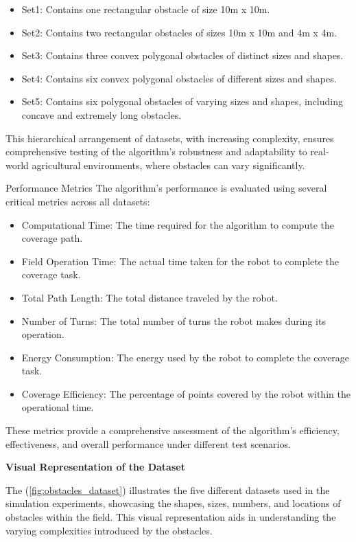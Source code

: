 \begin{itemize}
    \item Set1: Contains one rectangular obstacle of size 10m x 10m.
    \item Set2: Contains two rectangular obstacles of sizes 10m x 10m and 4m x 4m.
    \item Set3: Contains three convex polygonal obstacles of distinct sizes and shapes.
    \item Set4: Contains six convex polygonal obstacles of different sizes and shapes.
    \item Set5: Contains six polygonal obstacles of varying sizes and shapes, including concave and extremely long obstacles.
\end{itemize}
This hierarchical arrangement of datasets, with increasing complexity, ensures comprehensive testing of the algorithm's robustness and adaptability to real-world agricultural environments, where obstacles can vary significantly.

\vspace{3mm}  

Performance Metrics
The algorithm's performance is evaluated using several critical metrics across all datasets:

\begin{itemize}
    \item Computational Time: The time required for the algorithm to compute the coverage path.
    \item Field Operation Time: The actual time taken for the robot to complete the coverage task.
    \item Total Path Length: The total distance traveled by the robot.
    \item Number of Turns: The total number of turns the robot makes during its operation.
    \item Energy Consumption: The energy used by the robot to complete the coverage task.
    \item Coverage Efficiency: The percentage of points covered by the robot within the operational time.
\end{itemize}
These metrics provide a comprehensive assessment of the algorithm's efficiency, effectiveness, and overall performance under different test scenarios.


\vspace{3mm}  

\textbf{Visual Representation of the Dataset}

The (\autoref{fig:obstacles_dataset}) illustrates the five different datasets used in the simulation experiments, showcasing the shapes, sizes, numbers, and locations of obstacles within the field. This visual representation aids in understanding the varying complexities introduced by the obstacles.


